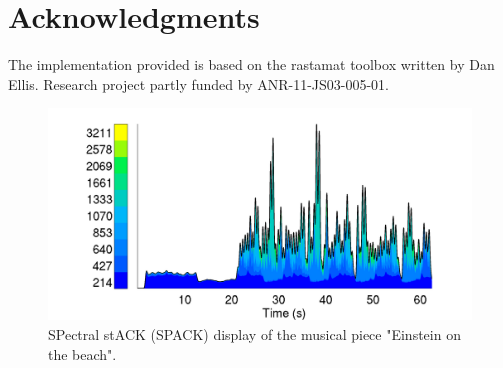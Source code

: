 \documentclass{article}
\begin{document}
\section{Acknowledgments}

The implementation provided is based on the rastamat toolbox written by Dan Ellis. Research project partly funded by ANR-11-JS03-005-01.






\begin{figure}
 \centering
\includegraphics[width=\textwidth]{einstein_spack}
\caption{SPectral stACK (SPACK) display of the musical piece "Einstein on the beach".}
\label{fig:einstein}
\end{figure}
\end{document}
